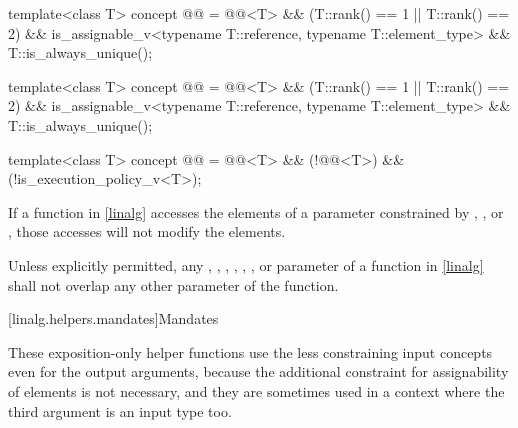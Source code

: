 \begin{codeblock}
template<class T>
  concept @@ =
    @@<T> && (T::rank() == 1 || T::rank() == 2) &&
    is_assignable_v<typename T::reference, typename T::element_type> && T::is_always_unique();

template<class T>
  concept @@ =
    @@<T> && (T::rank() == 1 || T::rank() == 2) &&
    is_assignable_v<typename T::reference, typename T::element_type> && T::is_always_unique();

template<class T>
  concept @@ =
    @@<T> && (!@@<T>) && (!is_execution_policy_v<T>);
\end{codeblock}

\pnum
If a function in \ref{linalg} accesses the elements
of a parameter constrained by
,
, or
,
those accesses will not modify the elements.

\pnum
Unless explicitly permitted, any
,
,
,
,
,
, or
parameter of a function in \ref{linalg}
shall not overlap any other  parameter of the function.

[linalg.helpers.mandates]{Mandates}

\pnum
\begin{note}
These exposition-only helper functions use
the less constraining input concepts even for the output arguments,
because the additional constraint for assignability of elements
is not necessary, and
they are sometimes used in a context
where the third argument is an input type too.
\end{note}

